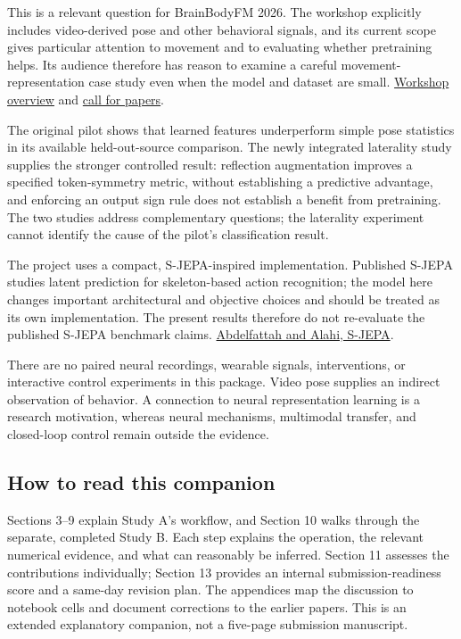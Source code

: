 \documentclass[11pt,letterpaper]{article}
\begin{document}
This is a relevant question for BrainBodyFM 2026. The workshop
explicitly includes video-derived pose and other behavioral signals, and
its current scope gives particular attention to movement and to
evaluating whether pretraining helps. Its audience therefore has reason
to examine a careful movement-representation case study even when the
model and dataset are small.
\href{https://brainbodyfm-workshop.github.io/}{Workshop overview} and
\href{https://brainbodyfm-workshop.github.io/call-for-papers.html}{call
for papers}.

The original pilot shows that learned features underperform simple pose
statistics in its available held-out-source comparison. The newly
integrated laterality study supplies the stronger controlled result:
reflection augmentation improves a specified token-symmetry metric,
without establishing a predictive advantage, and enforcing an output
sign rule does not establish a benefit from pretraining. The two studies
address complementary questions; the laterality experiment cannot
identify the cause of the pilot's classification result.

The project uses a compact, S-JEPA-inspired implementation. Published
S-JEPA studies latent prediction for skeleton-based action recognition;
the model here changes important architectural and objective choices and
should be treated as its own implementation. The present results
therefore do not re-evaluate the published S-JEPA benchmark claims.
\href{https://www.ecva.net/papers/eccv_2024/papers_ECCV/papers/04755.pdf}{Abdelfattah
and Alahi, S-JEPA}.

There are no paired neural recordings, wearable signals, interventions,
or interactive control experiments in this package. Video pose supplies
an indirect observation of behavior. A connection to neural
representation learning is a research motivation, whereas neural
mechanisms, multimodal transfer, and closed-loop control remain outside
the evidence.

\subsection{How to read this
companion}\label{how-to-read-this-companion}

Sections 3--9 explain Study A's workflow, and Section 10 walks through
the separate, completed Study B. Each step explains the operation, the
relevant numerical evidence, and what can reasonably be inferred.
Section 11 assesses the contributions individually; Section 13 provides
an internal submission-readiness score and a same-day revision plan. The
appendices map the discussion to notebook cells and document corrections
to the earlier papers. This is an extended explanatory companion, not a
five-page submission manuscript.
\end{document}
